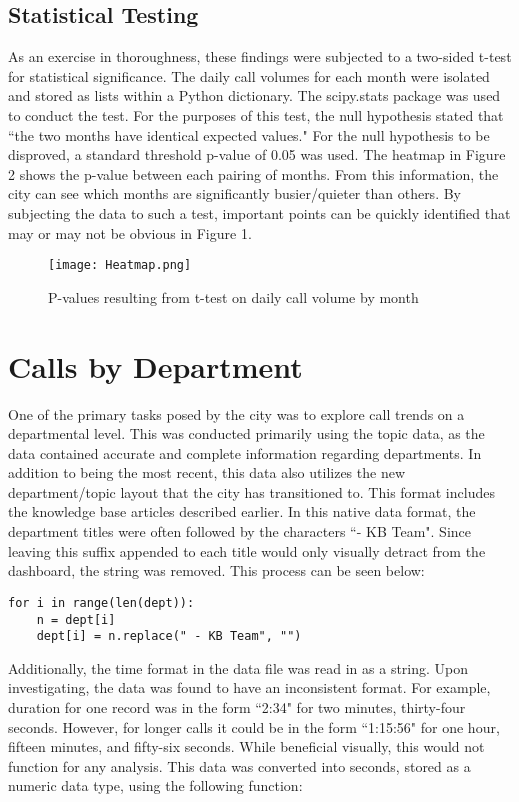 \documentclass[11pt,twocolumn]{article}
\begin{document}
\subsection{Statistical Testing}
As an exercise in thoroughness, these findings were subjected to a two-sided t-test for statistical significance.  The daily call volumes for each month were isolated and stored as lists within a Python dictionary.  The scipy.stats package was used to conduct the test.  For the purposes of this test, the null hypothesis stated that ``the two months have identical expected values."  For the null hypothesis to be disproved, a standard threshold p-value of 0.05 was used.  The heatmap in Figure 2 shows the p-value between each pairing of months.  From this information, the city can see which months are significantly busier/quieter than others.  By subjecting the data to such a test, important points can be quickly identified that may or may not be obvious in Figure 1.

\begin{figure}[h]
	\texttt{[image: Heatmap.png]}
	\caption{P-values resulting from t-test on daily call volume by month}
\end{figure}


\section{Calls by Department}
One of the primary tasks posed by the city was to explore call trends on a departmental level.  This was conducted primarily using the topic data, as the data contained accurate and complete information regarding departments.  In addition to being the most recent, this data also utilizes the new department/topic layout that the city has transitioned to.  This format includes the knowledge base articles described earlier.  In this native data format, the department titles were often followed by the characters ``- KB Team".  Since leaving this suffix appended to each title would only visually detract from the dashboard, the string was removed.  This process can be seen below:\\

  \begin{Verbatim}[fontsize=\small]
  for i in range(len(dept)):
    n = dept[i]
    dept[i] = n.replace(" - KB Team", "")
  \end{Verbatim}


Additionally, the time format in the data file was read in as a string.  Upon investigating, the data was found to have an inconsistent format.  For example, duration for one record was in the form ``2:34" for two minutes, thirty-four seconds.  However, for longer calls it could be in the form ``1:15:56" for one hour, fifteen minutes, and fifty-six seconds.  While beneficial visually, this would not function for any analysis.  This data was converted into seconds, stored as a numeric data type, using the following function:
\end{document}

